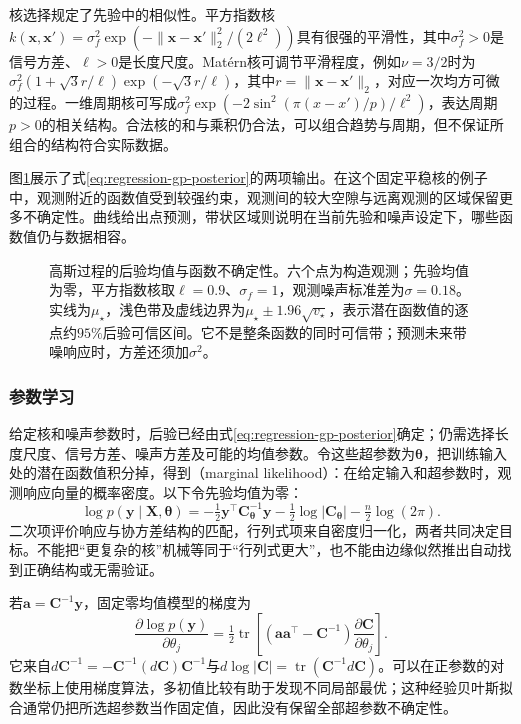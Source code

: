 核选择规定了先验中的相似性。平方指数核$k(\bm{x},\bm{x}')=\sigma_f^2\exp(-\lVert\bm{x}-\bm{x}'\rVert_2^2/(2\ell^2))$具有很强的平滑性，其中$\sigma_f^2>0$是信号方差、$\ell>0$是长度尺度。Matérn核可调节平滑程度，例如$\nu=3/2$时为$\sigma_f^2(1+\sqrt3r/\ell)\exp(-\sqrt3r/\ell)$，其中$r=\lVert\bm{x}-\bm{x}'\rVert_2$，对应一次均方可微的过程。一维周期核可写成$\sigma_f^2\exp(-2\sin^2(\pi(x-x')/p)/\ell^2)$，表达周期$p>0$的相关结构。合法核的和与乘积仍合法，可以组合趋势与周期，但不保证所组合的结构符合实际数据。

图\ref{fig:regression-gp-posterior}展示了式\eqref{eq:regression-gp-posterior}的两项输出。在这个固定平稳核的例子中，观测附近的函数值受到较强约束，观测间的较大空隙与远离观测的区域保留更多不确定性。曲线给出点预测，带状区域则说明在当前先验和噪声设定下，哪些函数值仍与数据相容。

\begin{figure}[htbp]
  \centering
  
  \caption{高斯过程的后验均值与函数不确定性。六个点为构造观测；先验均值为零，平方指数核取$\ell=0.9$、$\sigma_f=1$，观测噪声标准差为$\sigma=0.18$。实线为$\mu_{\star}$，浅色带及虚线边界为$\mu_{\star}\pm1.96\sqrt{v_{\star}}$，表示潜在函数值的逐点约$95\%$后验可信区间。它不是整条函数的同时可信带；预测未来带噪响应时，方差还须加$\sigma^2$。}
  \label{fig:regression-gp-posterior}
\end{figure}

\subsubsection{参数学习}
\label{sec:regression-gpr-learning}

给定核和噪声参数时，后验已经由式\eqref{eq:regression-gp-posterior}确定；仍需选择长度尺度、信号方差、噪声方差及可能的均值参数。令这些超参数为$\bm{\theta}$，把训练输入处的潜在函数值积分掉，得到（marginal likelihood）：在给定输入和超参数时，观测响应向量的概率密度。以下令先验均值为零：
\begin{equation}
  \log p(\bm{y}\mid\bm{X},\bm{\theta})
   =-\tfrac12\bm{y}^{\top}\bm{C}_{\bm{\theta}}^{-1}\bm{y}
    -\tfrac12\log|\bm{C}_{\bm{\theta}}|
    -\tfrac n2\log(2\pi).
  \label{eq:regression-gp-evidence}
\end{equation}
二次项评价响应与协方差结构的匹配，行列式项来自密度归一化，两者共同决定目标。不能把“更复杂的核”机械等同于“行列式更大”，也不能由边缘似然推出自动找到正确结构或无需验证。

若$\bm{a}=\bm{C}^{-1}\bm{y}$，固定零均值模型的梯度为
\[
  \frac{\partial\log p(\bm{y})}{\partial\theta_j}
  =\tfrac12\operatorname{tr}\!\left[
    (\bm{a}\bm{a}^{\top}-\bm{C}^{-1})
    \frac{\partial\bm{C}}{\partial\theta_j}\right].
\]
它来自$d\bm{C}^{-1}=-\bm{C}^{-1}(d\bm{C})\bm{C}^{-1}$与$d\log|\bm{C}|=\operatorname{tr}(\bm{C}^{-1}d\bm{C})$。可以在正参数的对数坐标上使用梯度算法，多初值比较有助于发现不同局部最优；这种经验贝叶斯拟合通常仍把所选超参数当作固定值，因此没有保留全部超参数不确定性。

